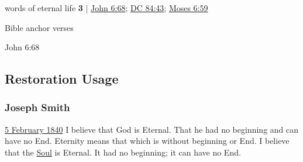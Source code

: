 \begin{compactdesc}
		\item[words of eternal life] \textbf{3} | \hyperref[JOHN-6-68]{John 6:68}; \hyperref[DC84-43]{DC 84:43}; \hyperref[MOSES-6-59]{Moses 6:59}
			\begin{compactdesc}
				\item[Bible anchor verses]
					\begin{compactitem}
						\item[John 6:68] 
					\end{compactitem}
			\end{compactdesc}
			
	\end{compactdesc}
	

\subsection{Restoration Usage} %
	\label{ETERNITY-RESTORATION}

	\subsubsection{Joseph Smith} %
		\label{ETERNITY-JS}
	
		\begin{compactdesc}
			\item[{\hyperref[EMS-1840-JS-5-FEB-1840]{5 February 1840}}] I believe that God is Eternal. That he had no beginning and can have no End. Eternity means that which is without beginning or End. I believe that the \uline{Soul} is Eternal. It had no beginning; it can have no End.
		\end{compactdesc}
		
	
	
